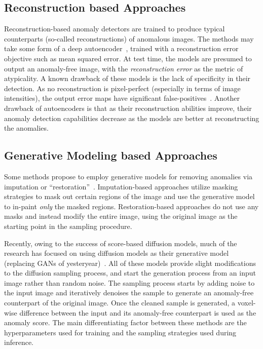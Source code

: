 \subsection*{Reconstruction based Approaches}
Reconstruction-based anomaly detectors are trained to produce typical counterparts (so-called reconstructions) of anomalous images. The methods may take some form of a deep autoencoder~\cite{dae-kascenas22a,baur2021}, trained with a reconstruction error objective such as mean squared error. At test time, the models are presumed to output an anomaly-free image, with the \textit{reconstruction error} as the metric of atypicality. A known drawback of these models is the lack of specificity in their detection. As no reconstruction is pixel-perfect (especially in terms of image intensities), the output error maps have significant false-positives~\cite{baur2021}. Another drawback of autoencoders is that as their reconstruction abilities improve, their anomaly detection capabilities decrease as the models are better at reconstructing the anomalies.

\subsection*{Generative Modeling based Approaches}
Some methods propose to employ generative models for removing anomalies via imputation or ``restoration''~\cite{schlegl2019f,pmlr-v102-you19a}. Imputation-based approaches utilize masking strategies to mask out certain regions of the image and use the generative model to in-paint \textit{only} the masked regions. Restoration-based approaches do not use any masks and instead modify the entire image, using the original image as the starting point in the sampling procedure.

Recently, owing to the success of score-based diffusion models, much of the research has focused on using diffusion models as their generative model (replacing GANs of yesteryear)~\cite{wyattAnoddpmAnomalyDetection2022,pinaya2022fast,liuUnsupervisedOutofDistributionDetection2023,behrendtPatchedDiffusionModels2023}. All of these models provide slight modifications to the diffusion sampling process, and start the generation process from an input image rather than random noise. The sampling process starts by adding noise to the input image and iteratively denoises the sample to generate an anomaly-free counterpart of the original image. Once the cleaned sample is generated, a voxel-wise difference between the input and its anomaly-free counterpart is used as the anomaly score. The main differentiating factor between these methods are the hyperparameters used for training and the sampling strategies used during inference. 

